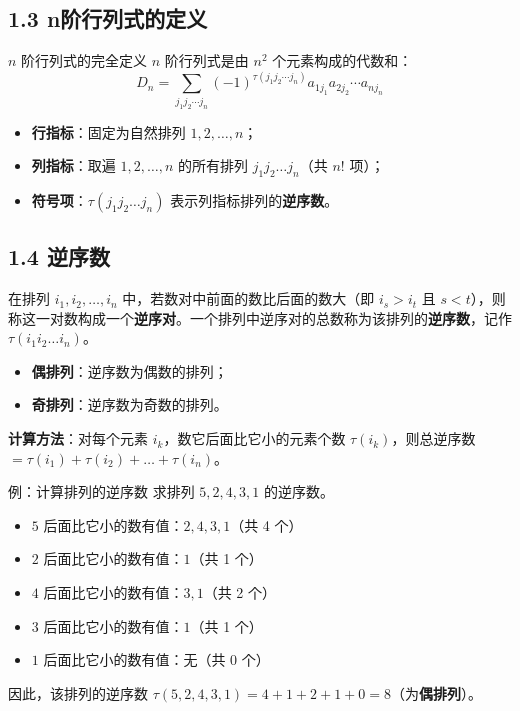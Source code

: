 \documentclass{ctexart}
\begin{document}
\subsection{1.3 n阶行列式的定义}
\begin{conceptbox}{$n$ 阶行列式的完全定义}
  $n$ 阶行列式是由 $n^2$ 个元素构成的代数和：
  \[
  D_n = \sum_{j_1 j_2 \cdots j_n} (-1)^{\tau(j_1 j_2 \cdots j_n)} a_{1j_1} a_{2j_2} \cdots a_{nj_n}
  \]
  \begin{itemize}
    \item \textbf{行指标}：固定为自然排列 $1, 2, \dots, n$；
    \item \textbf{列指标}：取遍 $1, 2, \dots, n$ 的所有排列 $j_1 j_2 \dots j_n$（共 $n!$ 项）；
    \item \textbf{符号项}：$\tau(j_1 j_2 \dots j_n)$ 表示列指标排列的\textbf{逆序数}。
  \end{itemize}
\end{conceptbox}

\subsection{1.4 逆序数}
在排列 $i_1, i_2, \dots, i_n$ 中，若数对中前面的数比后面的数大（即 $i_s > i_t$ 且 $s < t$），则称这一对数构成一个\textbf{逆序对}。一个排列中逆序对的总数称为该排列的\textbf{逆序数}，记作 $\tau(i_1 i_2 \dots i_n)$。
\begin{itemize}
  \item \textbf{偶排列}：逆序数为偶数的排列；
  \item \textbf{奇排列}：逆序数为奇数的排列。
\end{itemize}

\textbf{计算方法}：对每个元素 $i_k$，数它后面比它小的元素个数 $\tau(i_k)$，则总逆序数 $= \tau(i_1) + \tau(i_2) + \dots + \tau(i_n)$。

\begin{examplebox}{例：计算排列的逆序数}
  求排列 $5, 2, 4, 3, 1$ 的逆序数。
  \begin{itemize}
    \item $5$ 后面比它小的数有值：$2, 4, 3, 1$（共 4 个）
    \item $2$ 后面比它小的数有值：$1$（共 1 个）
    \item $4$ 后面比它小的数有值：$3, 1$（共 2 个）
    \item $3$ 后面比它小的数有值：$1$（共 1 个）
    \item $1$ 后面比它小的数有值：无（共 0 个）
  \end{itemize}
  因此，该排列的逆序数 $\tau(5,2,4,3,1) = 4 + 1 + 2 + 1 + 0 = 8$（为\textbf{偶排列}）。
\end{examplebox}
\end{document}
